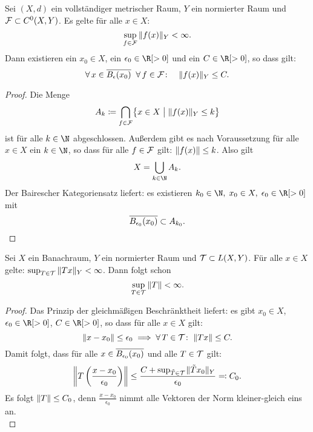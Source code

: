 \begin{thSatz} \label{vl09:satz5.2}
    Sei $(X,d)$ ein vollständiger metrischer Raum, $Y$ ein normierter Raum und 
    $\mathcal F \subset C^0(X,Y)$. Es gelte für alle $x\in X$: 
    \[ \sup_{f\in\mathcal F} \, \lVert f(x)\rVert_Y < \infty  . \] 
    Dann existieren ein $x_0\in X$, ein
    $\epsilon_0\in\R[>0]$ und ein $C\in\R[>0]$, so dass gilt:
    \[ \forall\,x\in\overline{B_\epsilon(x_0)}\;\;\forall\,f\in\mathcal F\colon\quad
        \lVert f(x)\rVert_Y \leq C
    . \]
\end{thSatz}

\begin{proof}
    Die Menge
    \[ A_k \coloneqq \bigcap_{f\in\mathcal F} 
        \bigl\{ x\in X \;\big\vert\; \lVert f(x)\rVert_Y \leq k \bigr\}
    \]
    ist für alle $k\in\N$ abgeschlossen. Außerdem gibt es nach Voraussetzung für
    alle $x\in X$ ein $k\in\N$, so dass für alle $f\in\mathcal F$ gilt:
    $\lVert f(x)\rVert\leq k$.
    Also gilt
    \[ X = \bigcup_{k\in\N} A_k . \]
    Der Bairescher Kategoriensatz 
    liefert: es existieren $k_0\in\N,\;x_0\in X,\;\epsilon_0\in\R[>0]$ mit
    \[ \overline{ B_{\epsilon_0}(x_0) } \subset A_{k_0}  . \]
\end{proof}

\begin{thSatz} \label{vl09:banachsteinhaus}
    Sei $X$ ein Banachraum, $Y$ ein normierter Raum und $\mathcal T\subset L(X,Y)$.
    Für alle $x\in X$ gelte: $\sup_{T\in\mathcal T} \, \lVert Tx\rVert_Y < \infty$.
    Dann folgt schon
    \[ \sup_{T\in\mathcal T} \, \lVert T\rVert  < \infty  . \]
\end{thSatz}

\begin{proof}
    Das Prinzip der gleichmäßigen Beschränktheit  liefert:
    es gibt $x_0\in X$, $\epsilon_0\in\R[>0]$, $C\in\R[>0]$, so dass 
    für alle $x\in X$ gilt:
    \[  \lVert x-x_0\rVert \leq \epsilon_0 
        \implies \forall\,T\in\mathcal T\colon\; \lVert Tx\rVert \leq C
    . \]
    Damit folgt, dass für alle $x\in\overline{B_{\epsilon_0}(x_0)}$ und alle
    $T\in\mathcal T$ gilt:
    \[ \norm*{T\left( \frac{x-x_0}{\epsilon_0} \right)} 
        \leq \frac{C + \sup_{\tilde T\in\mc T}
        \mkern1mu\norm{\tilde Tx_0}_Y}{\epsilon_0}
        \eqdef C_0 %
    . \]
    Es folgt $\lVert T\rVert \leq C_0$, denn $\frac{x-x_0}{\epsilon_0}$ nimmt alle
    Vektoren der Norm kleiner-gleich eins an.
    \\
\end{proof}

